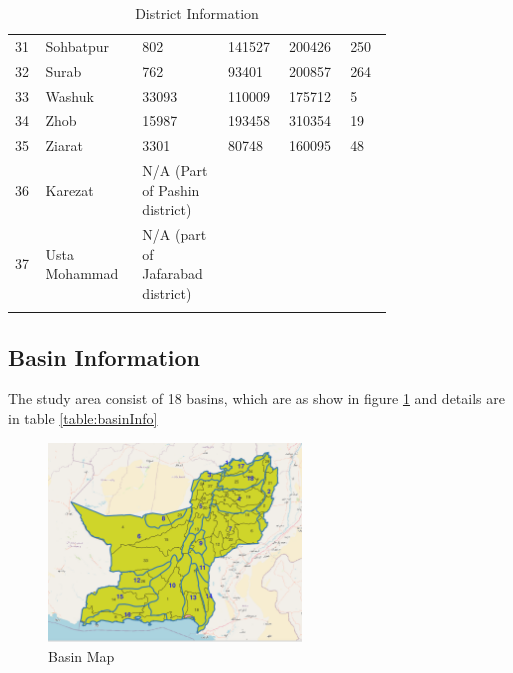 \begin{longtable}[H]{|p{0.05\linewidth} | p{0.2\linewidth} | p{0.2\linewidth} | p{0.1\linewidth} | p{0.1\linewidth} | p{0.1\linewidth}|}
    31      & Sohbatpur      & 802                              & 141527            & 200426            & 250               \\
    32      & Surab          & 762                              & 93401             & 200857            & 264               \\
    33      & Washuk         & 33093                            & 110009            & 175712            & 5                 \\
    34      & Zhob           & 15987                            & 193458            & 310354            & 19                \\
    35      & Ziarat         & 3301                             & 80748             & 160095            & 48                \\
    36      & Karezat        & N/A (Part of Pashin district)    &                   &                   &                   \\
    37      & Usta Mohammad  & N/A (part of Jafarabad district) &                   &                   &                   \\
    \hline
    \caption{District Information}
    \label{table:distInfo}
\end{longtable}

\subsection{Basin Information}
The study area consist of 18 basins, which are as show in figure \ref{fig:basinInfo} and details are in table \ref{table:basinInfo}

\begin{figure}[H]
    \centering
    \includegraphics[width=0.6\textwidth]{images/bol_basins.png}
    \caption{Basin Map}\label{fig:basinInfo}
\end{figure}

